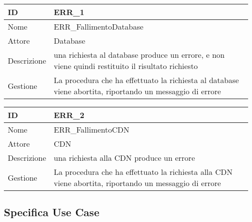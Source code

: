 \begin{tabular}{ |p{2cm}|p{10cm}|  }
\hline
ID & ERR\_1\\\hline
Nome & ERR\_FallimentoDatabase\\\hline
Attore & Database\\\hline
Descrizione & una richiesta al database produce un errore, e non viene quindi restituito il risultato richiesto\\\hline
Gestione &  La procedura che ha effettuato la richiesta al database viene abortita, riportando un messaggio di errore \\\hline
\end{tabular}
\label{table_errore:1}\newline

\begin{tabular}{ |p{2cm}|p{10cm}|  }
\hline
ID & ERR\_2\\\hline
Nome & ERR\_FallimentoCDN\\\hline
Attore & CDN\\\hline
Descrizione & una richiesta alla CDN produce un errore\\\hline
Gestione &  La procedura che ha effettuato la richiesta alla CDN viene abortita, riportando un messaggio di errore \\\hline
\end{tabular}
\label{table_errore:2}\newline

\subsection{Specifica Use Case}

